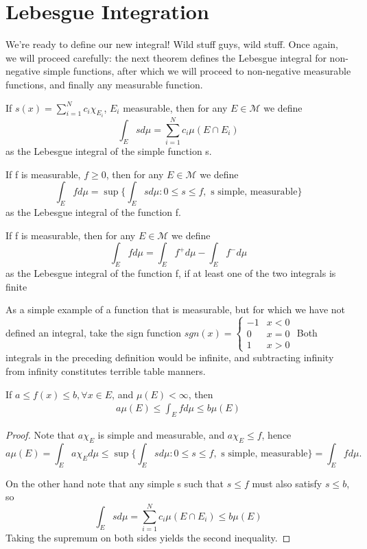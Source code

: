 \documentclass[11pt]{scrartcl}
\begin{document}

\section{Lebesgue Integration} 

We're ready to define our new integral! Wild stuff guys, wild stuff. Once again, we will proceed carefully: the next theorem defines the Lebesgue integral for non-negative simple functions, after which we will proceed to non-negative measurable functions, and finally any measurable function.

\begin{definition}
If $s(x) = \sum_{i=1}^N c_i \chi_{E_i}$, $E_i$ measurable, then for any $E\in \mathcal{M}$ we define $$\int_E s d\mu = \sum_{i=1}^N c_i \mu(E\cap E_i)$$ 
as the Lebesgue integral of the simple function s.
\end{definition}
\begin{definition}
If f is measurable, $f\geq 0$, then for any $E\in \mathcal{M}$ we define $$\int_E f d\mu = \sup \{ \int_E s d\mu: 0\leq s\leq f, \text{ s simple, measurable}\}$$ 
as the Lebesgue integral of the function f.
\end{definition}
\begin{definition}
If f is measurable, then for any $E\in \mathcal{M}$ we define $$\int_E f d\mu = \int_E f^+ d\mu - \int_E f^- d\mu$$ 
as the Lebesgue integral of the function f, if at least one of the two integrals is finite
\end{definition}

\begin{example}
As a simple example of a function that is measurable, but for which we have not defined an integral, take the sign function 
$sgn(x) = \begin{cases} 
-1 & x < 0 \\
 0 & x = 0 \\
 1 & x > 0 
\end{cases}$
Both integrals in the preceding definition would be infinite, and subtracting infinity from infinity constitutes terrible table manners.
\end{example}

\begin{proposition}
If $a\leq f(x) \leq b, \forall x\in E$, and $\mu(E)<\infty$, then 
\begin{align*}
a \mu(E) \leq \int_E f d\mu \leq b \mu(E) \tag{*}
\end{align*}
\end{proposition}
\begin{proof}
Note that $a \chi_E$ is simple and measurable, and $a \chi_E \leq f$, hence $$a \mu(E) =  \int_E a \chi_E d\mu \leq \sup \{ \int_E s d\mu: 0\leq s\leq f, \text{ s simple, measurable}\} = \int_E f d\mu .$$

On the other hand note that any simple s such that $s\leq f$ must also satisfy $s\leq b$, so $$\int_E s d\mu = \sum_{i=1}^N c_i \mu(E\cap E_i) \leq b \mu(E)$$
Taking the supremum on both sides yields the second inequality.
\end{proof}
\end{document}
